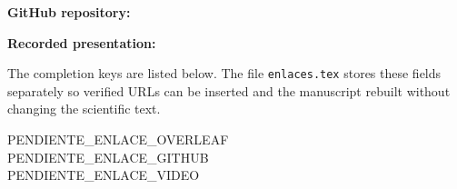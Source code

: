 \documentclass[conference,letterpaper]{IEEEtran}
\begin{document}
\medskip\noindent\textbf{GitHub repository:} \GitHubLink

\medskip\noindent\textbf{Recorded presentation:} \VideoLink

\medskip
The completion keys are listed below. The file \texttt{enlaces.tex} stores these fields separately so verified URLs can be inserted and the manuscript rebuilt without changing the scientific text.
\begin{flushleft}\small\ttfamily
PENDIENTE\_ENLACE\_OVERLEAF\\
PENDIENTE\_ENLACE\_GITHUB\\
PENDIENTE\_ENLACE\_VIDEO
\end{flushleft}



\end{document}

